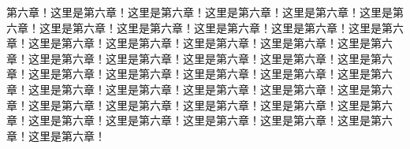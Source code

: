 第六章！这里是第六章！这里是第六章！这里是第六章！这里是第六章！这里是第六章！这里是第六章！这里是第六章！这里是第六章！这里是第六章！这里是第六章！这里是第六章！这里是第六章！这里是第六章！这里是第六章！这里是第六章！这里是第六章！这里是第六章！这里是第六章！这里是第六章！这里是第六章！这里是第六章！这里是第六章！这里是第六章！这里是第六章！这里是第六章！这里是第六章！这里是第六章！这里是第六章！这里是第六章！这里是第六章！这里是第六章！这里是第六章！这里是第六章！这里是第六章！这里是第六章！这里是第六章！这里是第六章！这里是第六章！这里是第六章！这里是第六章！这里是第六章！